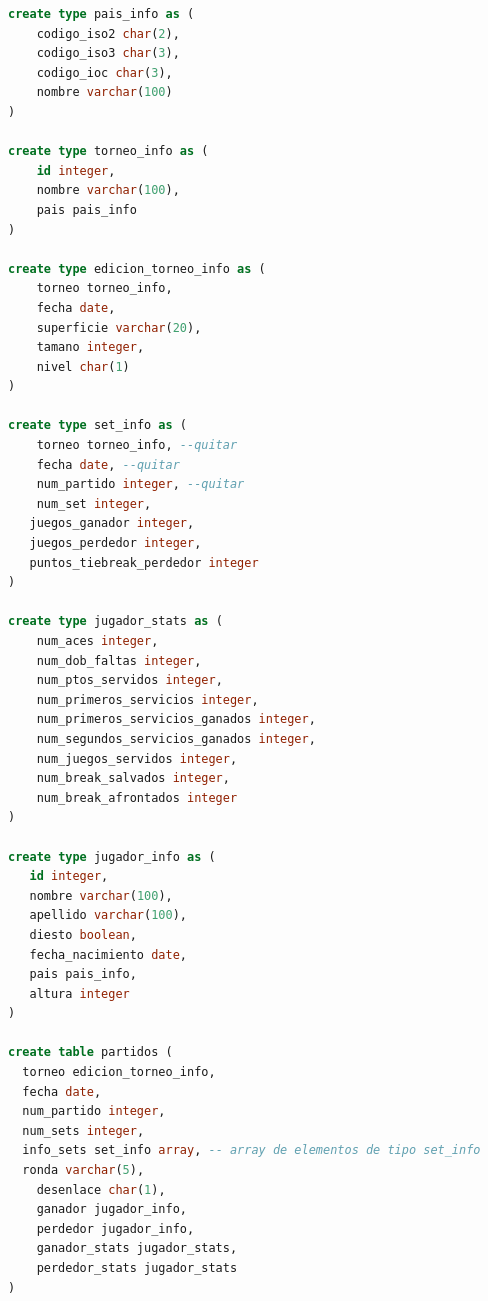 \documentclass[10pt]{opticajnl}
\begin{document}
\begin{lstlisting}[language=SQL]
create type pais_info as (
	codigo_iso2 char(2),
	codigo_iso3 char(3),
	codigo_ioc char(3),
	nombre varchar(100)
)

create type torneo_info as (
	id integer,
	nombre varchar(100),
	pais pais_info
)

create type edicion_torneo_info as (
	torneo torneo_info,
	fecha date,
	superficie varchar(20),
	tamano integer,
	nivel char(1)
)

create type set_info as (
	torneo torneo_info, --quitar
	fecha date, --quitar
	num_partido integer, --quitar
    num_set integer,
   juegos_ganador integer,
   juegos_perdedor integer,
   puntos_tiebreak_perdedor integer
)

create type jugador_stats as (
	num_aces integer,
	num_dob_faltas integer,
	num_ptos_servidos integer,
	num_primeros_servicios integer,
	num_primeros_servicios_ganados integer,
	num_segundos_servicios_ganados integer,
	num_juegos_servidos integer,
	num_break_salvados integer,
	num_break_afrontados integer
)

create type jugador_info as (
   id integer,
   nombre varchar(100),
   apellido varchar(100),
   diesto boolean,
   fecha_nacimiento date,
   pais pais_info,
   altura integer
)

create table partidos (
  torneo edicion_torneo_info,
  fecha date,
  num_partido integer,
  num_sets integer,
  info_sets set_info array, -- array de elementos de tipo set_info
  ronda varchar(5), 
	desenlace char(1), 
	ganador jugador_info,
	perdedor jugador_info,
	ganador_stats jugador_stats,
	perdedor_stats jugador_stats
)
\end{lstlisting}
\end{document}
